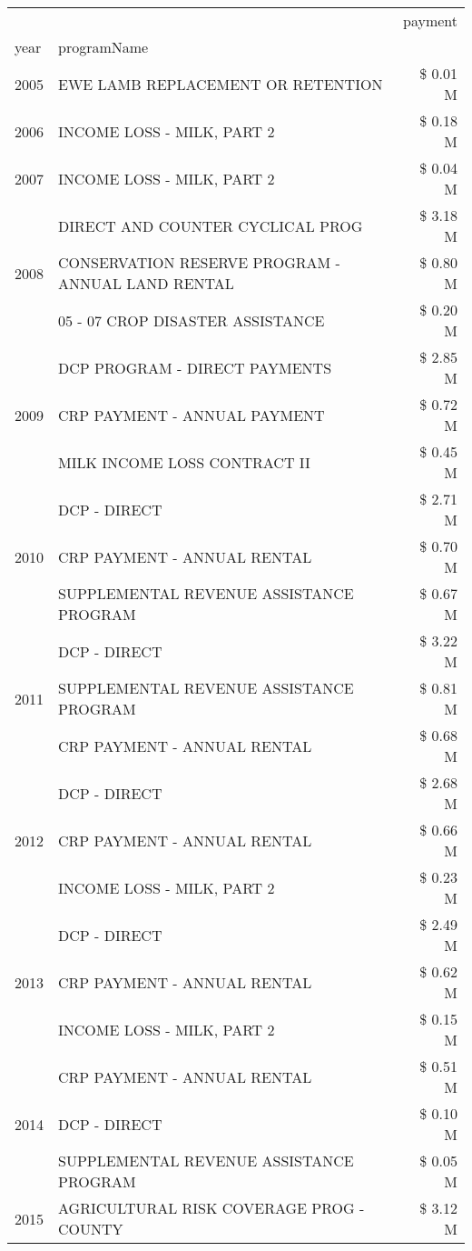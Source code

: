 \begin{tabular}{llr}
\toprule
 &  & payment \\
year & programName &  \\
\midrule
2005 & EWE LAMB REPLACEMENT OR RETENTION & \$ 0.01 M \\
\cline{1-3}
2006 & INCOME LOSS - MILK, PART 2 & \$ 0.18 M \\
\cline{1-3}
2007 & INCOME LOSS - MILK, PART 2 & \$ 0.04 M \\
\cline{1-3}
\multirow[t]{3}{*}{2008} & DIRECT AND COUNTER CYCLICAL PROG & \$ 3.18 M \\
 & CONSERVATION RESERVE PROGRAM - ANNUAL LAND RENTAL & \$ 0.80 M \\
 & 05 - 07 CROP DISASTER ASSISTANCE & \$ 0.20 M \\
\cline{1-3}
\multirow[t]{3}{*}{2009} & DCP PROGRAM - DIRECT PAYMENTS & \$ 2.85 M \\
 & CRP PAYMENT - ANNUAL PAYMENT & \$ 0.72 M \\
 & MILK INCOME LOSS CONTRACT II & \$ 0.45 M \\
\cline{1-3}
\multirow[t]{3}{*}{2010} & DCP - DIRECT & \$ 2.71 M \\
 & CRP PAYMENT - ANNUAL RENTAL & \$ 0.70 M \\
 & SUPPLEMENTAL REVENUE ASSISTANCE PROGRAM & \$ 0.67 M \\
\cline{1-3}
\multirow[t]{3}{*}{2011} & DCP - DIRECT & \$ 3.22 M \\
 & SUPPLEMENTAL REVENUE ASSISTANCE PROGRAM & \$ 0.81 M \\
 & CRP PAYMENT - ANNUAL RENTAL & \$ 0.68 M \\
\cline{1-3}
\multirow[t]{3}{*}{2012} & DCP - DIRECT & \$ 2.68 M \\
 & CRP PAYMENT - ANNUAL RENTAL & \$ 0.66 M \\
 & INCOME LOSS - MILK, PART 2 & \$ 0.23 M \\
\cline{1-3}
\multirow[t]{3}{*}{2013} & DCP - DIRECT & \$ 2.49 M \\
 & CRP PAYMENT - ANNUAL RENTAL & \$ 0.62 M \\
 & INCOME LOSS - MILK, PART 2 & \$ 0.15 M \\
\cline{1-3}
\multirow[t]{3}{*}{2014} & CRP PAYMENT - ANNUAL RENTAL & \$ 0.51 M \\
 & DCP - DIRECT & \$ 0.10 M \\
 & SUPPLEMENTAL REVENUE ASSISTANCE PROGRAM & \$ 0.05 M \\
\cline{1-3}
\multirow[t]{3}{*}{2015} & AGRICULTURAL RISK COVERAGE PROG - COUNTY & \$ 3.12 M \\

\end{tabular}
